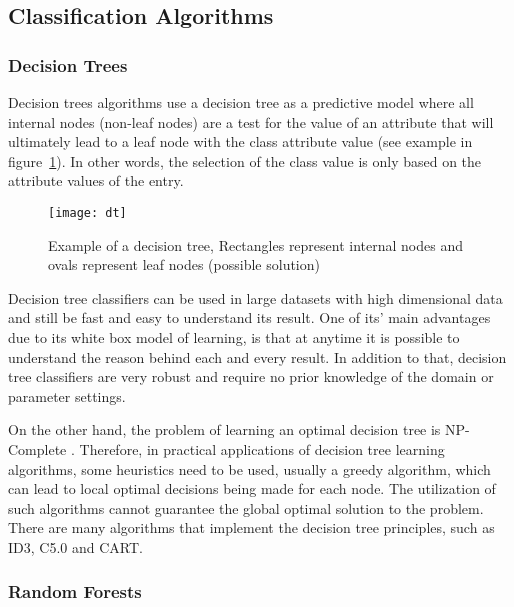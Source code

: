 \subsection{Classification Algorithms}\label{sec:classification}

\subsubsection{Decision Trees}

Decision trees algorithms use a decision tree as a predictive model where all
internal nodes (non-leaf nodes) are a test for the value of an attribute that
will ultimately lead to a leaf node with the class attribute value (see example
in figure~\ref{fig:dtree}). In other words, the selection of the class value is
only based on the attribute values of the entry.\cite{HanKam06}

\begin{figure}[h] \begin{center} \leavevmode
  \texttt{[image: dt]} \caption{Example of a decision
  tree, Rectangles represent internal nodes and ovals represent leaf nodes
(possible solution)\cite{KER:70953}} \label{fig:dtree} \end{center} \end{figure}

Decision tree classifiers can be used in large datasets with high dimensional
data and still be fast and easy to understand its result. One of its' main
advantages due to its white box model of learning, is that at anytime it is
possible to understand the reason behind each and every result. In addition to
that, decision tree classifiers are very robust and require no prior knowledge
of the domain or parameter settings.

On the other hand, the problem of learning an optimal decision tree is
NP-Complete \cite{Hyafil197615}. Therefore, in practical applications of
decision tree learning algorithms, some heuristics need to be used, usually a
greedy algorithm, which can lead to local optimal decisions being made for each
node. The utilization of such algorithms cannot guarantee the global optimal
solution to the problem. There are many algorithms that implement the decision
tree principles, such as ID3, C5.0 and CART.

\subsubsection{Random Forests}

